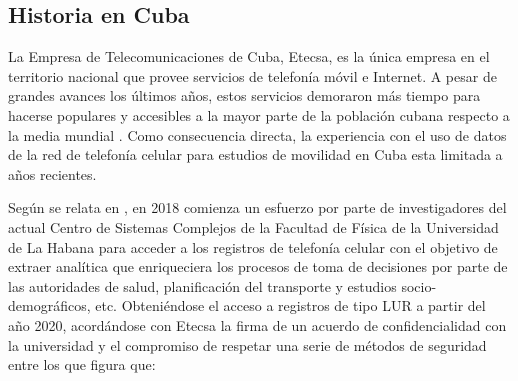 


\subsection*{Historia en Cuba}

La Empresa de Telecomunicaciones de Cuba, Etecsa, es la única empresa en el territorio nacional que provee servicios de telefonía móvil e Internet. A pesar de grandes avances los últimos años, estos servicios demoraron más tiempo para hacerse populares y accesibles a la mayor parte de la población cubana respecto a la media mundial \cite{durive2021sistema}. Como consecuencia directa, la experiencia con el uso de datos de la red de telefonía celular para estudios de movilidad en Cuba esta limitada a años recientes.

Según se relata en \cite{durive2021sistema}, en 2018 comienza un esfuerzo por parte de investigadores del actual Centro de Sistemas Complejos de la Facultad de Física de la Universidad de La Habana para acceder a los registros de telefonía celular con el objetivo de extraer analítica que enriqueciera los procesos de toma de decisiones por parte de las autoridades de salud, planificación del transporte y estudios socio-demográficos, etc. Obteniéndose el acceso a registros de tipo LUR a partir del año 2020, acordándose con Etecsa la firma de un acuerdo de confidencialidad con la universidad y el compromiso de respetar una serie de métodos de seguridad entre los que figura que:


